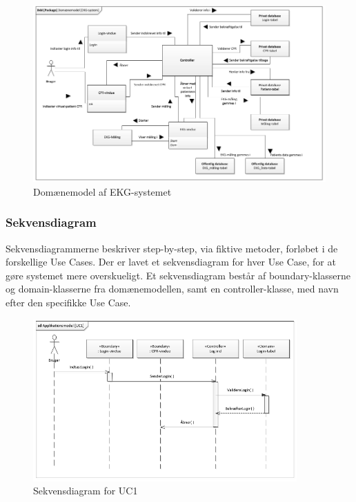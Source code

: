 \begin{figure}[H]
	\centering
	\includegraphics[width=1\textwidth]{Figurer/Snip20150525_18}
	\caption{Domænemodel af EKG-systemet}
\end{figure}

\subsubsection{Sekvensdiagram}
Sekvensdiagrammerne beskriver step-by-step, via fiktive metoder, forløbet i de forskellige Use Cases. Der er lavet et sekvensdiagram for hver Use Case, for at gøre systemet mere overskueligt. Et sekvensdiagram består af boundary-klasserne og domain-klasserne fra domænemodellen, samt en controller-klasse, med navn efter den specifikke Use Case.  

\begin{figure}[H]
	\centering
	\includegraphics[width=0.9\textwidth]{Figurer/Snip20150429_34}
	\caption{Sekvensdiagram for UC1}
\end{figure}

